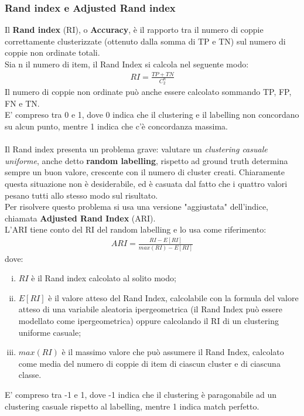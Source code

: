 \subsubsection{Rand index e Adjusted Rand index}
Il \textbf{Rand index} (RI), o \textbf{Accuracy}, è il rapporto tra il numero di coppie correttamente clusterizzate (ottenuto dalla somma di TP e TN) sul numero di coppie non ordinate totali.\\
Sia n il numero di item, il Rand Index si calcola nel seguente modo:
\begin{align}
RI = \frac{TP + TN}{C_2^n}
\end{align}
Il numero di coppie non ordinate può anche essere calcolato sommando TP, FP, FN e TN.\\
E' compreso tra 0 e 1, dove 0 indica che il clustering e il labelling non concordano su alcun punto, mentre 1 indica che c'è concordanza massima.\\
\\
Il Rand index presenta un problema grave: valutare un \textit{clustering casuale uniforme}, anche detto \textbf{random labelling}, rispetto ad ground truth determina sempre un buon valore, crescente con il numero di cluster creati. Chiaramente questa situazione non è desiderabile, ed è casuata dal fatto che i quattro valori pesano tutti allo stesso modo sul risultato.\\
Per risolvere questo problema si usa una versione "aggiustata" dell'indice, chiamata \textbf{Adjusted Rand Index} (ARI)\cite{ari}.\\
L'ARI tiene conto del RI del random labelling e lo usa come riferimento:
\begin{align}
ARI = \frac{RI - E[RI]}{max(RI) - E[RI]}
\end{align}
dove:
\begin{enumerate}[(i)]
	\item $ RI $ è il Rand index calcolato al solito modo;
	\item $ E[RI] $ è il valore atteso del Rand Index, calcolabile con la formula del valore atteso di una variabile aleatoria ipergeometrica (il Rand Index può essere modellato come ipergeometrica) oppure calcolando il RI di un clustering uniforme casuale;
	\item $ max(RI) $ è il massimo valore che può assumere il Rand Index, calcolato come media del numero di coppie di item di ciascun cluster e di ciascuna classe.
\end{enumerate}
E' compreso tra -1 e 1, dove -1 indica che il clustering è paragonabile ad un clustering casuale rispetto al labelling, mentre 1 indica match perfetto.\\

